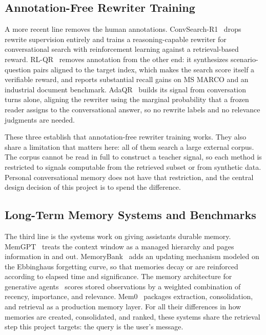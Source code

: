 \documentclass[12pt,letterpaper,oneside]{report}
\begin{document}
\subsection{Annotation-Free Rewriter Training}
\label{sec:related-labelfree}

A more recent line removes the human annotations. ConvSearch-R1~\cite{convsearchr1}
drops rewrite supervision entirely and trains a reasoning-capable rewriter for
conversational search with reinforcement learning against a retrieval-based
reward. RL-QR~\cite{rlqr} removes annotation from the other end: it synthesizes
scenario-question pairs aligned to the target index, which makes the search
score itself a verifiable reward, and reports substantial recall gains on MS
MARCO and an industrial document benchmark. AdaQR~\cite{adaqr} builds its
signal from conversation turns alone, aligning the rewriter using the marginal
probability that a frozen reader assigns to the conversational answer, so no
rewrite labels and no relevance judgments are needed.

These three establish that annotation-free rewriter training works. They also
share a limitation that matters here: all of them search a large external
corpus. The corpus cannot be read in full to construct a teacher signal, so
each method is restricted to signals computable from the retrieved subset or
from synthetic data. Personal conversational memory does not have that
restriction, and the central design decision of this project is to spend the
difference.

\subsection{Long-Term Memory Systems and Benchmarks}
\label{sec:related-memory}

The third line is the systems work on giving assistants durable memory.
MemGPT~\cite{memgpt} treats the context window as a managed hierarchy and pages
information in and out. MemoryBank~\cite{memorybank} adds an updating mechanism
modeled on the Ebbinghaus forgetting curve, so that memories decay or are
reinforced according to elapsed time and significance. The memory architecture
for generative agents~\cite{genagents} scores stored observations by a weighted
combination of recency, importance, and relevance. Mem0~\cite{mem0} packages
extraction, consolidation, and retrieval as a production memory layer. For all
their differences in how memories are created, consolidated, and ranked, these
systems share the retrieval step this project targets: the query is the user's
message.
\end{document}
